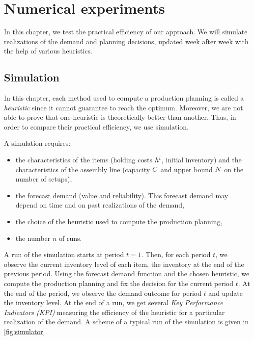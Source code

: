\chapter{Numerical experiments}
\label{chap:PDP:numerical-experiments}




In this chapter, we test the practical efficiency of our approach.
We will simulate realizations of the demand and planning decisions, updated week after week with the help of various heuristics.


\section{Simulation}


In this chapter, each method used to compute a production planning is called a \emph{heuristic} since it cannot guarantee to reach the optimum.
Moreover, we are not able to prove that one heuristic is theoretically better than another.
Thus, in order to compare their practical efficiency, we use simulation.




A simulation requires:
\begin{itemize}
  \item the characteristics of the items (holding costs $h^i$, initial inventory) and the characteristics of the assembly line (capacity $C$ and upper bound $N$ on the number of setups),
  \item the forecast demand (value and reliability). This forecast demand may depend on time and on past realizations of the demand,
  \item the choice of the heuristic used to compute the production planning,
  \item the number $n$ of runs.
\end{itemize}
A run of the simulation starts at period $t=1$.
Then, for each period $t$, we observe the current inventory level of each item, \ie the inventory at the end of the previous period.
Using the forecast demand function and the chosen heuristic, we compute the production planning and fix the decision for the current period $t$.
At the end of the period, we observe the demand outcome for period $t$ and update the inventory level.
At the end of a run, we get several \emph{Key Performance Indicators (KPI)} measuring the efficiency of the heuristic for a particular realization of the demand.
A scheme of a typical run of the simulation is given in \cref{fig:simulator}.


